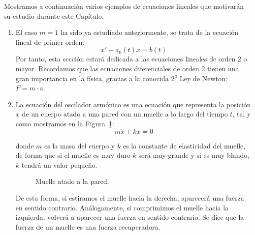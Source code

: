 \begin{ejemplo}
    Mostramos a continuación varios ejemplos de ecuaciones lineales que motivarán su estudio durante este Capítulo.
    \begin{enumerate}
        \item El caso $m=1$ ha sido ya estudiado anteriormente, se trata de la ecuación lineal de primer orden:
            \begin{equation*}
                x' + a_0(t)x = b(t)
            \end{equation*}
            Por tanto, esta sección estará dedicada a las ecuaciones lineales de orden 2 o mayor. Recordamos que las ecuaciones diferenciales de orden 2 tienen una gran importancia en la física, gracias a la conocida $2^a$ Ley de Newton: $F=m\cdot a$.
        \item La ecuación del oscilador armónico es una ecuación que representa la posición $x$ de un cuerpo atado a una pared con un muelle a lo largo del tiempo $t$, tal y como mostramos en la Figura~\ref{fig:muelle}:
            \begin{equation*}
                m\ddot{x} + kx = 0
            \end{equation*}

            donde $m$ es la masa del cuerpo y $k$ es la constante de elasticidad del muelle, de forma que si el muelle es muy duro $k$ será muy grande y si es muy blando, $k$ tendrá un valor pequeño.

            \begin{figure}[H]
                \centering
            \caption{Muelle atado a la pared.}
            \label{fig:muelle}
            \end{figure}

            De esta forma, si estiramos el muelle hacia la derecha, aparecerá una fuerza en sentido contrario. Análogamente, si comprimimos el muelle hacia la izquierda, volverá a aparecer una fuerza en sentido contrario. Se dice que la fuerza de un muelle es una fuerza recuperadora.\\


\end{enumerate}
\end{ejemplo}
